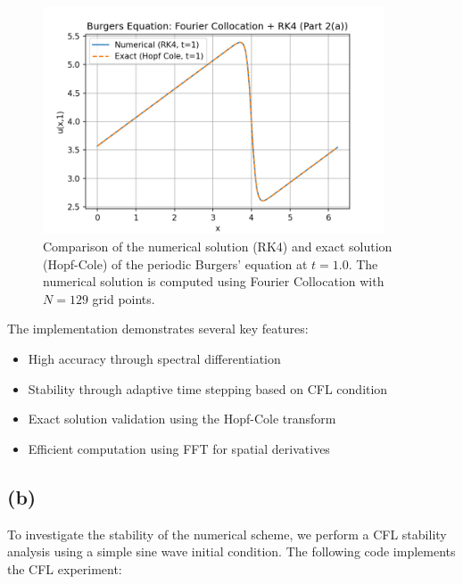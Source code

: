 \documentclass{article}
\begin{document}
\begin{figure}[htbp]
    \centering
    \includegraphics[width=0.9\textwidth]{figure/burgers_solution_part2a.png}
    \caption{Comparison of the numerical solution (RK4) and exact solution (Hopf-Cole) of the periodic Burgers' equation at $t=1.0$. The numerical solution is computed using Fourier Collocation with $N=129$ grid points.}
    \label{fig:burgers_solution_part2a}
\end{figure}

The implementation demonstrates several key features:
\begin{itemize}
    \item High accuracy through spectral differentiation
    \item Stability through adaptive time stepping based on CFL condition
    \item Exact solution validation using the Hopf-Cole transform
    \item Efficient computation using FFT for spatial derivatives
\end{itemize}

\subsection*{(b)}
To investigate the stability of the numerical scheme, we perform a CFL stability analysis using a simple sine wave initial condition. The following code implements the CFL experiment:
\end{document}
